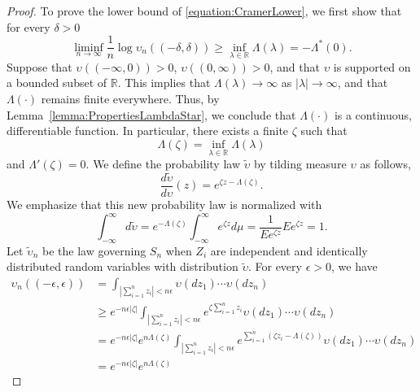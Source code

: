 \begin{proof}
To prove the lower bound of \eqref{equation:CramerLower}, we first show that for every $\delta > 0$
\begin{equation} \label{equation:CramerCenteredLower}
\liminf_{n \rightarrow \infty} \frac{1}{n} \log \upsilon_n ((- \delta, \delta))
\geq \inf_{\lambda \in \mathbb{R}} \Lambda (\lambda) = - \Lambda^*(0) .
\end{equation}
Suppose that $\upsilon ((- \infty, 0)) > 0$, $\upsilon ((0, \infty)) > 0$, and that $\upsilon$ is supported on a bounded subset of $\mathbb{R}$.
This implies that $\Lambda (\lambda) \rightarrow \infty$ as $|\lambda| \rightarrow \infty$, and that $\Lambda (\cdot)$ remains finite everywhere.
Thus, by Lemma~\ref{lemma:PropertiesLambdaStar}, we conclude that $\Lambda (\cdot)$ is a continuous, differentiable function.
In particular, there exists a finite $\zeta$ such that
\begin{equation*}
\Lambda(\zeta) = \inf_{\lambda \in \mathbb{R}} \Lambda (\lambda)
\end{equation*}
and $\Lambda'(\zeta) = 0$.
We define the probability law $\tilde{\upsilon}$ by tilding measure $\upsilon$ as follows,
\begin{equation*}
\frac{d \tilde{\upsilon}}{d \upsilon} (z) = e^{\zeta z - \Lambda(\zeta)} .
\end{equation*}
We emphasize that this new probability law is normalized with
\begin{equation*}
\int_{-\infty}^{\infty} d \tilde{\upsilon}
= e^{- \Lambda(\zeta)} \int_{-\infty}^{\infty} e^{\zeta z} d\mu
= \frac{1}{E e^{\zeta z}} E e^{\zeta z} = 1 .
\end{equation*}
Let $\tilde{\upsilon}_n$ be the law governing $S_n$ when $Z_i$ are independent and identically distributed random variables with distribution $\tilde{\upsilon}$.
For every $\epsilon > 0$, we have
\begin{equation*}
\begin{split}
\upsilon_n ((- \epsilon, \epsilon))
&= \int_{\left| \sum_{i=1}^n z_i \right| < n \epsilon}
\upsilon(dz_1) \cdots \upsilon (dz_n) \\
&\geq e^{- n \epsilon | \zeta |} \int_{\left| \sum_{i=1}^n z_i \right| < n \epsilon}
e^{\zeta \sum_{i=1}^n z_i} \upsilon(dz_1) \cdots \upsilon (dz_n) \\
&= e^{- n \epsilon | \zeta |} e^{n \Lambda(\zeta)}
\int_{\left| \sum_{i=1}^n z_i \right| < n \epsilon}
e^{\sum_{i=1}^n (\zeta z_i - \Lambda(\zeta))} \upsilon(dz_1) \cdots \upsilon (dz_n) \\
&= e^{- n \epsilon | \zeta |} e^{n \Lambda(\zeta)}

\end{split}
\end{equation*}
\end{proof}

